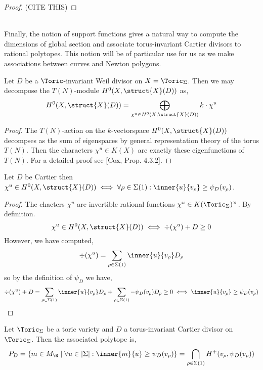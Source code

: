 \documentclass[12pt]{article}
\begin{document}
\begin{proof}
(CITE THIS)
\end{proof}
\noindent\\
Finally, the notion of support functions gives a natural way to compute the dimensions of global section and associate torus-invariant Cartier divisors to rational polytopes. This notion will be of particular use for us as we make associations between curves and Newton polygons.

\begin{thm}
Let $D$ be a $\Toric$-invariant Weil divisor on $X = \Toric_\Sigma$. Then we may decompose the $T(N)$-module $H^0(X, \struct{X}(D))$ as,
\[ H^0(X, \struct{X}(D)) = \bigoplus_{\chi^u \in H^0(X, \struct{X}(D))} k \cdot \chi^u \]
\end{thm}

\begin{proof}
The $T(N)$-action on the $k$-vectorspace $H^0(X, \struct{X}(D))$  decompses as the sum of eigenspaces by general representation theory of the torus $T(N)$. Then the characters $\chi^u \in K(X)$ are exactly these eigenfunctions of $T(N)$. For a detailed proof see [Cox, Prop. 4.3.2].
\end{proof}

\begin{lemma}
Let $D$ be Cartier then
$\chi^u \in H^0(X, \struct{X}(D)) \iff \forall \rho \in \Sigma(1) : \inner{u}{v_\rho} \ge \psi_D(v_\rho)$.
\end{lemma}

\begin{proof}
The chacters $\chi^u$ are invertible rational functions $\chi^u \in K(\Toric_\Sigma)^\times$. By definition. 
\[ \chi^u \in H^0(X, \struct{X}(D)) \iff \div(\chi^u) + D \ge 0 \]
However, we have computed,
\[ \div{(\chi^u)} = \sum_{\rho \in \Sigma(1)} \inner{u}{v_\rho} D_\rho \]
so by the definition of $\psi_D$ we have,
\[ \div(\chi^u) + D = \sum_{\rho \in \Sigma(1)} \inner{u}{v_\rho} D_\rho  + \sum_{\rho \in \Sigma(1)} -\psi_D(v_\rho) D_\rho \ge 0 \iff \inner{u}{v_\rho} \ge \psi_D(v_\rho) \]
\end{proof}

\begin{prop}
Let $\Toric_\Sigma$ be a toric variety and $D$ a torus-invariant Cartier divisor on $\Toric_\Sigma$. Then the associated polytope is,
\[ P_D = \{ m \in M_\R \mid \forall u \in |\Sigma| : \inner{m}{u} \ge \psi_D(v_\rho) \} = \bigcap_{\rho \in \Sigma(1)} H^+(v_\rho, \psi_D(v_\rho)) \]
\end{prop}
\end{document}
